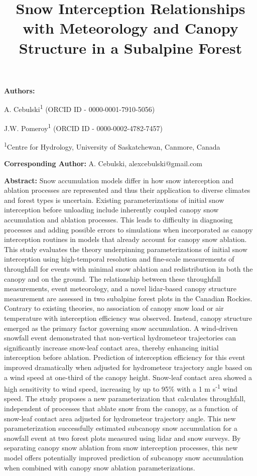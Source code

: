 \documentclass[
  letterpaper,
  DIV=11,
  numbers=noendperiod]{scrartcl}
\title{Snow Interception Relationships with Meteorology and Canopy
Structure in a Subalpine Forest}
\author{}
\date{}
\begin{document}
\maketitle



\textbf{Authors:}

A. Cebulski\textsuperscript{1} (ORCID ID - 0000-0001-7910-5056)

J.W. Pomeroy\textsuperscript{1} (ORCID ID - 0000-0002-4782-7457)

\textsuperscript{1}Centre for Hydrology, University of Saskatchewan,
Canmore, Canada

\textbf{Corresponding Author:} A. Cebulski, alexcebulski@gmail.com

\textbf{Abstract:} Snow accumulation models differ in how snow
interception and ablation processes are represented and thus their
application to diverse climates and forest types is uncertain. Existing
parameterizations of initial snow interception before unloading include
inherently coupled canopy snow accumulation and ablation processes. This
leads to difficulty in diagnosing processes and adding possible errors
to simulations when incorporated as canopy interception routines in
models that already account for canopy snow ablation. This study
evaluates the theory underpinning parameterizations of initial snow
interception using high-temporal resolution and fine-scale measurements
of throughfall for events with minimal snow ablation and redistribution
in both the canopy and on the ground. The relationship between these
throughfall measurements, event meteorology, and a novel lidar-based
canopy structure measurement are assessed in two subalpine forest plots
in the Canadian Rockies. Contrary to existing theories, no association
of canopy snow load or air temperature with interception efficiency was
observed. Instead, canopy structure emerged as the primary factor
governing snow accumulation. A wind-driven snowfall event demonstrated
that non-vertical hydrometeor trajectories can significantly increase
snow-leaf contact area, thereby enhancing initial interception before
ablation. Prediction of interception efficiency for this event improved
dramatically when adjusted for hydrometeor trajectory angle based on a
wind speed at one-third of the canopy height. Snow-leaf contact area
showed a high sensitivity to wind speed, increasing by up to 95\% with a
1 m s\textsuperscript{-1} wind speed. The study proposes a new
parameterization that calculates throughfall, independent of processes
that ablate snow from the canopy, as a function of snow-leaf contact
area adjusted for hydrometeor trajectory angle. This new
parameterization successfully estimated subcanopy snow accumulation for
a snowfall event at two forest plots measured using lidar and snow
surveys. By separating canopy snow ablation from snow interception
processes, this new model offers potentially improved prediction of
subcanopy snow accumulation when combined with canopy snow ablation
parameterizations.
\end{document}
